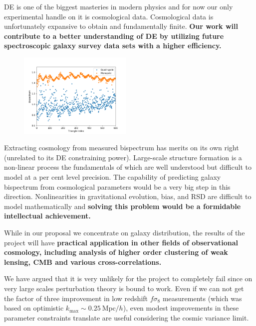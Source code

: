 DE is one of the biggest masteries in modern physics and for now our only
experimental handle on it is cosmological data. Cosmological data is
unfortunately expansive to obtain and fundamentally finite. \textbf{Our work
will contribute to a better understanding of DE by utilizing future
spectroscopic galaxy survey data sets with a higher efficiency.} 

\begin{figure}
\begin{center}
\includegraphics[width=0.48\textwidth]{MonQuad.png}
\end{center}
\end{figure}


Extracting cosmology from measured bispectrum has merits on its own right
(unrelated to its DE constraining power). Large-scale structure formation is a
non-linear process the fundamentals of which are well understood but difficult
to model at a per cent level precision. The capability of predicting galaxy
bispectrum from cosmological parameters would be a very big step in this
direction. Nonlinearities in gravitational evolution, bias, and RSD are
difficult to model mathematically and \textbf{solving this problem would be a
formidable intellectual achievement.}

While in our proposal we concentrate on galaxy distribution, the results of the
project will have \textbf{practical application in other fields of observational
cosmology, including analysis of higher order clustering of weak lensing, CMB
and various cross-correlations.}


We have argued that it is very unlikely for the project to completely fail
since on very large scales perturbation theory is bound to work. Even if we can
not get the factor of three improvement in low redshift $f\sigma_8$
measurements (which was based on optimistic $k_\mathrm{max}\sim 0.25\
\mathrm{Mpc}/h$), even modest improvements in these parameter constraints
translate are useful considering the cosmic variance limit. 

